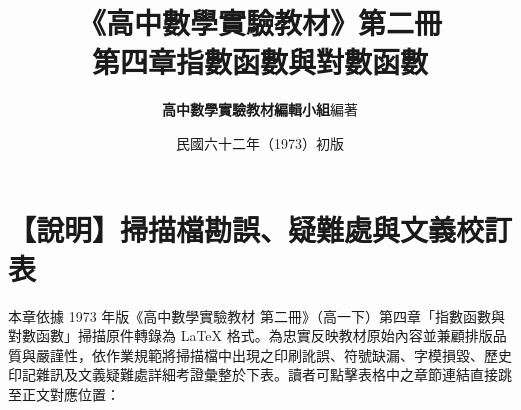 \documentclass[a4paper,12pt,twoside]{article}
\title{\LARGE\textbf{《高中數學實驗教材》第二冊}\\[0.5em] \Large\textbf{第四章\quad 指數函數與對數函數}}
\author{\textbf{高中數學實驗教材編輯小組}\quad 編著}
\date{民國六十二年（1973）初版}
\begin{document}
\maketitle
\thispagestyle{firstpage}

\section*{【說明】掃描檔勘誤、疑難處與文義校訂表}
\label{sec:errata_notes}

本章依據 1973 年版《高中數學實驗教材 第二冊》（高一下）第四章「指數函數與對數函數」掃描原件轉錄為 \LaTeX{} 格式。為忠實反映教材原始內容並兼顧排版品質與嚴謹性，依作業規範將掃描檔中出現之印刷訛誤、符號缺漏、字模損毀、歷史印記雜訊及文義疑難處詳細考證彙整於下表。讀者可點擊表格中之章節連結直接跳至正文對應位置：
\end{document}

